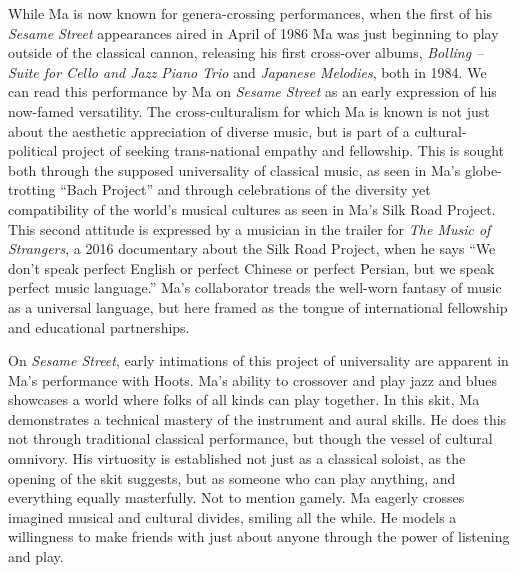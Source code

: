 \documentclass[12pt,letterpaper]{article}
\begin{document}
	While Ma is now known for genera-crossing performances, when the first
	of his \textit{Sesame Street} appearances aired in April of
	1986\autocite{2210} Ma was just beginning to play outside of the 
	classical cannon, releasing his first cross-over albums, 
	\textit{Bolling – Suite for Cello and Jazz Piano Trio} and 
	\textit{Japanese Melodies}, both in 1984.\autocite{MaSite} We can read 
	this performance by Ma on \textit{Sesame Street} as an early expression
	of his now-famed versatility. The cross-culturalism for which Ma is 
	known is not just about the aesthetic appreciation of diverse music, but
	is part of a cultural-political project of seeking trans-national 
	empathy and fellowship. This is sought both through the supposed 
	universality of classical music, as seen in Ma's globe-trotting 
	``Bach Project''\autocite{BachProject} and through celebrations of the 
	diversity yet compatibility of the world's musical cultures as seen in 
	Ma's Silk Road Project. This second attitude is expressed by a musician 
	in the trailer for \textit{The Music of Strangers}, a 2016 documentary 
	about the Silk Road Project, when he says ``We don't speak perfect 
	English or perfect Chinese or perfect Persian, but we speak perfect 
	music language.''\autocite{Strangers} Ma's collaborator treads the
	well-worn fantasy of music as a universal language, but here framed as
	the tongue of international fellowship and educational
	partnerships.

	On \textit{Sesame Street}, early intimations of this project of 
	universality are apparent in Ma's performance with Hoots. Ma's ability 
	to crossover and play jazz and blues showcases a world where folks of 
	all kinds can play together. In this skit, Ma demonstrates a technical 
	mastery of the instrument and
	aural skills. He does this not through traditional classical 
	performance,
	but though the vessel of cultural omnivory. His virtuosity is 
	established not just as a classical soloist, as the opening of the skit
	suggests, but as someone who can play anything, and everything equally 
	masterfully. Not to mention gamely. Ma eagerly crosses imagined musical
	and cultural divides, smiling all the while. He models a willingness to
	make friends with just about anyone through the power of listening and 
	play.
\end{document}
